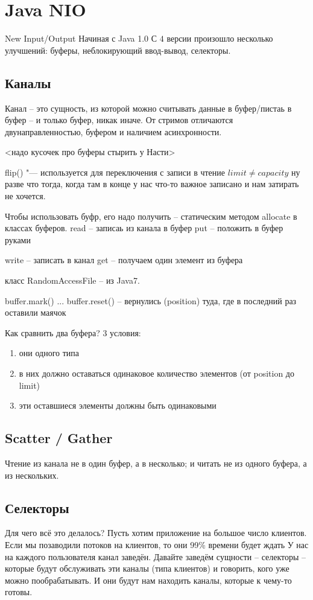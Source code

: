 \section{Java NIO}
New Input/Output
Начиная с Java 1.0
С $4$ версии произошло несколько улучшений: буферы, неблокирующий ввод-вывод, селекторы.

\subsection{Каналы}
Канал -- это сущность, из которой можно считывать данные в буфер/пистаь в буфер -- и только буфер, никак иначе.
От стримов отличаются двунаправленностью, буфером и наличием асинхронности.

<надо кусочек про буферы стырить у Насти>

flip() "--- используется для переключения с записи в чтение
$limit \ne capacity$ ну разве что тогда, когда там в конце у нас что-то важное записано и нам затирать не хочется.

Чтобы использовать буфр, его надо получить -- статическим методом allocate в классах буферов.
read -- записаь из канала в буфер
put -- положить в буфер руками

write -- записать в канал
get -- получаем один элемент из буфера

класс RandomAccessFile -- из Java7.

buffer.mark()
...
buffer.reset() -- вернулись (position) туда, где в последний раз оставили маячок

Как сравнить два буфера? 3 условия:
\begin{enumerate}
\item они одного типа
\item в них должно оставаться одинаковое количество элементов (от position до limit)
\item эти оставшиеся элементы должны быть одинаковыми
\end{enumerate}

\subsection{Scatter / Gather}
Чтение из канала не в один буфер, а в несколько; и читать не из одного буфера, а из нескольких.

\subsection{Селекторы}
Для чего всё это делалось? Пусть хотим приложение на большое число клиентов. Если мы позаводили потоков на клиентов, то они 99\% времени будет 
ждать
У нас на каждого пользователя канал заведён. 
Давайте заведём сущности -- селекторы -- которые будут обслуживать эти каналы (типа клиентов) и говорить, кого уже можно пообрабатывать. 
И они будут нам находить каналы, которые к чему-то готовы.

